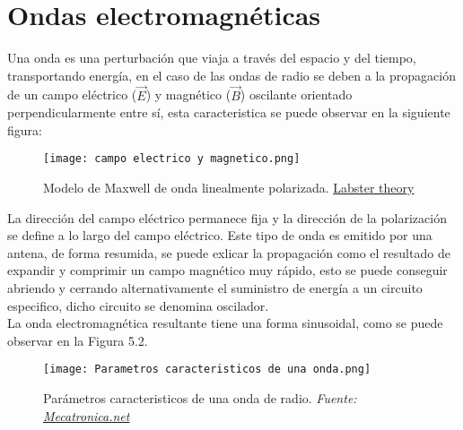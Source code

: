 \chapter{Ondas electromagnéticas}
\chapterspaceabove{6.75cm} %
\chapterspacebelow{7.25cm} %
\pagestyle{fancy}

Una onda es una perturbación que viaja a través del espacio y del tiempo, transportando energía, en el caso de las ondas de radio se deben a la propagación de un campo eléctrico (\(\vec{E}\)) y magnético (\(\vec{B}\)) oscilante orientado perpendicularmente entre sí, esta caracteristica se puede observar en la siguiente figura:

\begin{figure}[H]
    \centering
    \texttt{[image: campo electrico y magnetico.png]}
    \caption{Modelo de Maxwell de onda linealmente polarizada. \href{https://theory.labster.com/es/electromagnetic-waves/}{Labster theory}}
    \label{fig:placeholdeeeeer}
\end{figure}

La dirección del campo eléctrico permanece fija y la dirección de la polarización se define a lo largo del campo eléctrico. Este tipo de onda es emitido por una antena, de forma resumida, se puede exlicar la propagación como el resultado de expandir y comprimir un campo magnético muy rápido, esto se puede conseguir abriendo y cerrando alternativamente el suministro de energía a un circuito especifico, dicho circuito se denomina oscilador.\\

La onda electromagnética resultante tiene una forma sinusoidal, como se puede observar en la Figura 5.2.\\

\begin{figure}[H]
    \centering
    \texttt{[image: Parametros caracteristicos de una onda.png]}
    \caption{Parámetros caracteristicos de una onda de radio.  \textit{Fuente: \href{https://www.mecatronica.net/emilio/fisica/MovimientoOndulatorio.htm}{Mecatronica.net}}}
    \label{fig:placeholdereonda}
\end{figure}

